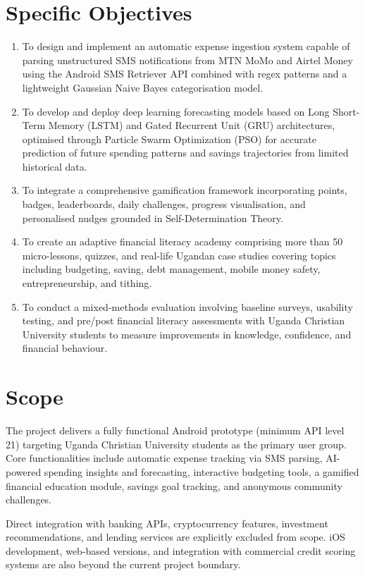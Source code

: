 \documentclass[12pt,a4paper]{report}
\begin{document}
\section{Specific Objectives}

\begin{enumerate}
    \item To design and implement an automatic expense ingestion system capable of parsing unstructured SMS notifications from MTN MoMo and Airtel Money using the Android SMS Retriever API combined with regex patterns and a lightweight Gaussian Naive Bayes categorisation model.
    \item To develop and deploy deep learning forecasting models based on Long Short-Term Memory (LSTM) and Gated Recurrent Unit (GRU) architectures, optimised through Particle Swarm Optimization (PSO) for accurate prediction of future spending patterns and savings trajectories from limited historical data.
    \item To integrate a comprehensive gamification framework incorporating points, badges, leaderboards, daily challenges, progress visualisation, and personalised nudges grounded in Self-Determination Theory.
    \item To create an adaptive financial literacy academy comprising more than 50 micro-lessons, quizzes, and real-life Ugandan case studies covering topics including budgeting, saving, debt management, mobile money safety, entrepreneurship, and tithing.
    \item To conduct a mixed-methods evaluation involving baseline surveys, usability testing, and pre/post financial literacy assessments with Uganda Christian University students to measure improvements in knowledge, confidence, and financial behaviour.
\end{enumerate}

\section{Scope}

The project delivers a fully functional Android prototype (minimum API level 21) targeting Uganda Christian University students as the primary user group. Core functionalities include automatic expense tracking via SMS parsing, AI-powered spending insights and forecasting, interactive budgeting tools, a gamified financial education module, savings goal tracking, and anonymous community challenges.

Direct integration with banking APIs, cryptocurrency features, investment recommendations, and lending services are explicitly excluded from scope. iOS development, web-based versions, and integration with commercial credit scoring systems are also beyond the current project boundary.
\end{document}
